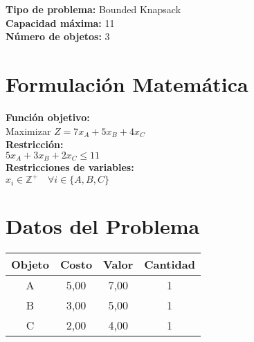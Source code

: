 \documentclass{article}
\begin{document}
\thispagestyle{empty}
\newpage
\textbf{Tipo de problema:} Bounded Knapsack\\
\textbf{Capacidad máxima:} 11\\
\textbf{Número de objetos:} 3\\

\section*{Formulación Matemática}
\textbf{Función objetivo:}\\
Maximizar $Z = 7 x_{A} + 5 x_{B} + 4 x_{C}$\\

\textbf{Restricción:}\\
$5 x_{A} + 3 x_{B} + 2 x_{C} \leq 11$\\

\textbf{Restricciones de variables:}\\
$x_i \in \mathbb{Z}^+ \quad \forall i \in \{A, B, C\}$\\
\vspace{0.5cm}

\section*{Datos del Problema}
\begin{tabular}{|c|c|c|c|}
\hline
Objeto & Costo & Valor & Cantidad \\
\hline
A & 5,00 & 7,00 & 1 \\
B & 3,00 & 5,00 & 1 \\
C & 2,00 & 4,00 & 1 \\
\hline
\end{tabular}
\end{document}

